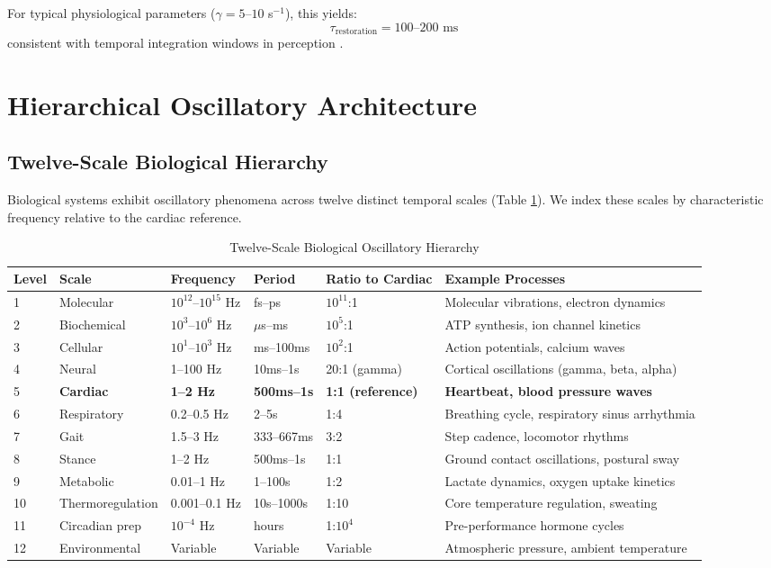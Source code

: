 \documentclass[12pt]{article}
\theoremstyle{remark}
\begin{document}
For typical physiological parameters ($\gamma = 5$--$10$ s$^{-1}$), this yields:
\begin{equation}
\tau_{\text{restoration}} = 100\text{--}200 \text{ ms}
\end{equation}
consistent with temporal integration windows in perception \citep{vanzijl2004temporal}.

\section{Hierarchical Oscillatory Architecture}

\subsection{Twelve-Scale Biological Hierarchy}

Biological systems exhibit oscillatory phenomena across twelve distinct temporal scales (Table \ref{tab:hierarchy}). We index these scales by characteristic frequency relative to the cardiac reference.

\begin{table}[t]
\centering
\caption{Twelve-Scale Biological Oscillatory Hierarchy}
\label{tab:hierarchy}
\begin{tabular}{@{}llllll@{}}
\toprule
\textbf{Level} & \textbf{Scale} & \textbf{Frequency} & \textbf{Period} & \textbf{Ratio to Cardiac} & \textbf{Example Processes} \\
\midrule
1 & Molecular & $10^{12}$--$10^{15}$ Hz & fs--ps & $10^{11}$:1 & Molecular vibrations, electron dynamics \\
2 & Biochemical & $10^3$--$10^6$ Hz & $\mu$s--ms & $10^5$:1 & ATP synthesis, ion channel kinetics \\
3 & Cellular & $10^1$--$10^3$ Hz & ms--100ms & $10^2$:1 & Action potentials, calcium waves \\
4 & Neural & 1--100 Hz & 10ms--1s & 20:1 (gamma) & Cortical oscillations (gamma, beta, alpha) \\
5 & \textbf{Cardiac} & \textbf{1--2 Hz} & \textbf{500ms--1s} & \textbf{1:1 (reference)} & \textbf{Heartbeat, blood pressure waves} \\
6 & Respiratory & 0.2--0.5 Hz & 2--5s & 1:4 & Breathing cycle, respiratory sinus arrhythmia \\
7 & Gait & 1.5--3 Hz & 333--667ms & 3:2 & Step cadence, locomotor rhythms \\
8 & Stance & 1--2 Hz & 500ms--1s & 1:1 & Ground contact oscillations, postural sway \\
9 & Metabolic & 0.01--1 Hz & 1--100s & 1:2 & Lactate dynamics, oxygen uptake kinetics \\
10 & Thermoregulation & 0.001--0.1 Hz & 10s--1000s & 1:10 & Core temperature regulation, sweating \\
11 & Circadian prep & $10^{-4}$ Hz & hours & 1:$10^4$ & Pre-performance hormone cycles \\
12 & Environmental & Variable & Variable & Variable & Atmospheric pressure, ambient temperature \\
\bottomrule
\end{tabular}
\end{table}
\end{document}
